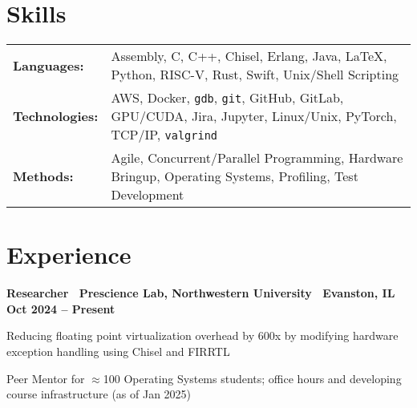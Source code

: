 \documentclass[10pt]{article}
\newenvironment{mylist}[1][]
{\itemize[nosep, wide=0pt, leftmargin=*, after=\strut]}
{\enditemize}
\begin{document}

\section{Skills}
\begin{tabularx}{\linewidth}{@{}l X@{}}
    \textbf{Languages:} & Assembly, C, C++, Chisel, Erlang, Java, \LaTeX, Python, RISC-V, Rust, Swift, Unix/Shell Scripting \\
    \textbf{Technologies:} & AWS, Docker, \texttt{gdb}, \texttt{git}, GitHub, GitLab, GPU/CUDA, Jira, Jupyter, Linux/Unix, PyTorch, TCP/IP, \texttt{valgrind} \\
    \textbf{Methods:} & Agile, Concurrent/Parallel Programming, Hardware Bringup, Operating Systems, Profiling, Test Development
\end{tabularx}


\section{Experience}
\begin{minipage}[t]{\linewidth}
    \textbf{Researcher \textbar \ Prescience Lab, Northwestern University \textbar \ Evanston, IL} \hfill \textbf{Oct 2024 -- Present} 
    \begin{mylist}
        \item Reducing floating point virtualization overhead by 600x by modifying hardware exception handling using Chisel and FIRRTL
        \item Peer Mentor for $\approx$100 Operating Systems students; office hours and developing course infrastructure (as of Jan 2025)
    \end{mylist}
\end{minipage}
\end{document}
